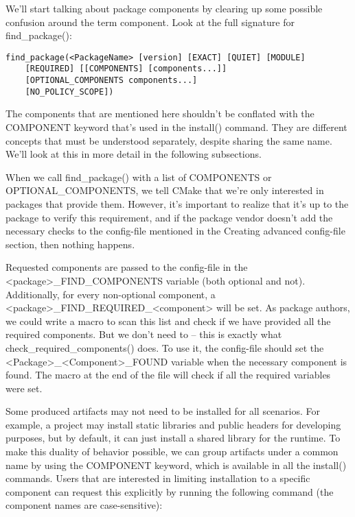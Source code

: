 
We'll start talking about package components by clearing up some possible confusion around the term component. Look at the full signature for find\_package():

\begin{lstlisting}[style=styleCMake]
find_package(<PackageName> [version] [EXACT] [QUIET] [MODULE]
	[REQUIRED] [[COMPONENTS] [components...]]
	[OPTIONAL_COMPONENTS components...]
	[NO_POLICY_SCOPE])
\end{lstlisting}

The components that are mentioned here shouldn't be conflated with the COMPONENT keyword that's used in the install() command. They are different concepts that must be understood separately, despite sharing the same name. We'll look at this in more detail in the following subsections.


When we call find\_package() with a list of COMPONENTS or OPTIONAL\_COMPONENTS, we tell CMake that we're only interested in packages that provide them. However, it's important to realize that it's up to the package to verify this requirement, and if the package vendor doesn't add the necessary checks to the config-file mentioned in the Creating advanced config-file section, then nothing happens.

Requested components are passed to the config-file in the <package>\_FIND\_COMPONENTS variable (both optional and not). Additionally, for every non-optional component, a <package>\_FIND\_REQUIRED\_<component> will be set. As package authors, we could write a macro to scan this list and check if we have provided all the required components. But we don't need to – this is exactly what check\_required\_components() does. To use it, the config-file should set the <Package>\_<Component>\_FOUND variable when the necessary component is found. The macro at the end of the file will check if all the required variables were set.


Some produced artifacts may not need to be installed for all scenarios. For example, a project may install static libraries and public headers for developing purposes, but by default, it can just install a shared library for the runtime. To make this duality of behavior possible, we can group artifacts under a common name by using the COMPONENT keyword, which is available in all the install() commands. Users that are interested in limiting installation to a specific component can request this explicitly by running the following command (the component names are case-sensitive):

